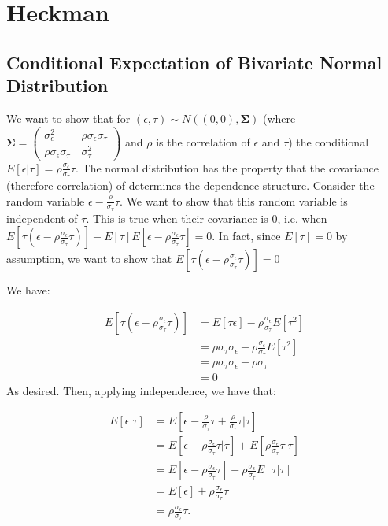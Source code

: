 \documentclass[12pt,twoside]{reedthesis}
\theoremstyle{definition}
\begin{document}
\section{Heckman}
\subsection{Conditional Expectation of Bivariate Normal Distribution}

We want to show that for $(\epsilon, \tau) \sim N((0,0), \boldsymbol{\Sigma})$ (where $\boldsymbol{\Sigma} = \begin{pmatrix}
\sigma_\epsilon^2 &\ \rho \sigma_\epsilon \sigma_\tau \\
\rho \sigma_\epsilon \sigma_\tau &\ \sigma_\tau^2
\end{pmatrix}$ and $\rho$ is the correlation of $\epsilon$ and $\tau$) the conditional $E[\epsilon | \tau] = \rho \frac{\sigma_\epsilon}{\sigma_\tau} \tau$. The normal distribution has the property that the covariance (therefore correlation) of determines the dependence structure. Consider the random variable $\epsilon - \frac{\rho}{\sigma_\tau} \tau$. We want to show that this random variable is independent of $\tau$. This is true when their covariance is $0$, i.e. when $E[\tau (\epsilon -\rho \frac{\sigma_\epsilon}{\sigma_\tau}\tau)] - E[\tau] E[\epsilon - \rho \frac{\sigma_\epsilon}{\sigma_\tau}  \tau] = 0$. In fact, since $E[\tau]=0$ by assumption, we want to show that $E[\tau (\epsilon -\rho \frac{\sigma_\epsilon}{\sigma_\tau} \tau)] = 0$

We have:

\begin{align*}
E[\tau (\epsilon - \rho \frac{\sigma_\epsilon}{\sigma_\tau} \tau)] &= E[\tau \epsilon] -  \rho \frac{\sigma_\epsilon}{\sigma_\tau} E[\tau^2] \\
&=  \rho \sigma_\tau \sigma_\epsilon -  \rho \frac{\sigma_\epsilon}{\sigma_\tau}E[\tau^2] \\ 
&= \rho \sigma_\tau \sigma_\epsilon -  \rho \sigma_\tau \\
&= 0
\end{align*}
As desired. Then, applying independence, we have that:

\begin{align*}
E[\epsilon | \tau] &= E[\epsilon - \frac{\rho}{\sigma_\tau} \tau +  \frac{\rho}{\sigma_\tau} \tau | \tau] \\
&= E[\epsilon - \rho \frac{\sigma_\epsilon}{\sigma_\tau} \tau | \tau] + E[\rho \frac{\sigma_\epsilon}{\sigma_\tau} \tau | \tau] \\
&= E[\epsilon - \rho \frac{\sigma_\epsilon}{\sigma_\tau} \tau] +\rho \frac{\sigma_\epsilon}{\sigma_\tau}E[\tau | \tau] \\
&= E[\epsilon] + \rho \frac{\sigma_\epsilon}{\sigma_\tau} \tau \\
&= \rho \frac{\sigma_\epsilon}{\sigma_\tau} \tau. 
\end{align*}
\end{document}
